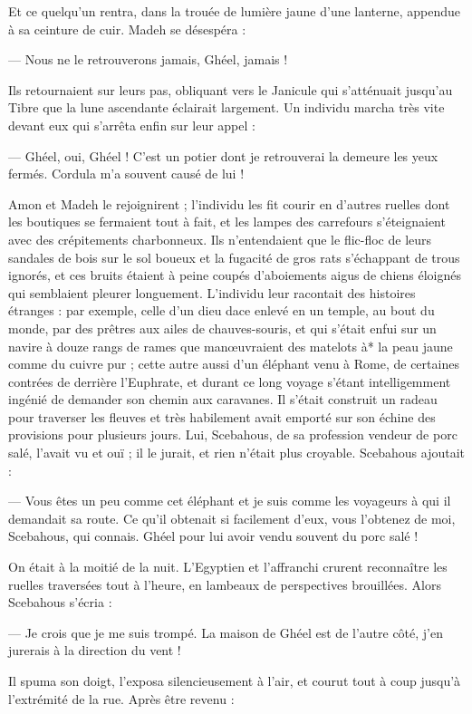 \documentclass[a4paper, 11pt, oneside, polutonikogreek, french]{article}
\begin{document}
Et ce quelqu'un rentra, dans la trouée de lumière jaune d'une lanterne, appendue à sa ceinture de cuir. Madeh se désespéra :

--- Nous ne le retrouverons jamais, Ghéel, jamais !

Ils retournaient sur leurs pas, obliquant vers le Janicule qui s'atténuait jusqu'au Tibre que la lune ascendante éclairait largement. Un individu marcha très vite devant eux qui s'arrêta enfin sur leur appel :

--- Ghéel, oui, Ghéel ! C'est un potier dont je retrouverai la demeure les yeux fermés. Cordula m'a souvent causé de lui !

Amon et Madeh le rejoignirent ; l'individu les fit courir en d'autres ruelles dont les boutiques se fermaient tout à fait, et les lampes des carrefours s'éteignaient avec des crépitements charbonneux. Ils n'entendaient que le flic-floc de leurs sandales de bois sur le sol boueux et la fugacité de gros rats s'échappant de trous ignorés, et ces bruits étaient à peine coupés d'aboiements aigus de chiens éloignés qui semblaient pleurer longuement. L'individu leur racontait des histoires étranges : par exemple, celle d'un dieu dace enlevé en un temple, au bout du monde, par des prêtres aux ailes de chauves-souris, et qui s'était enfui sur un navire à douze rangs de rames que manœuvraient des matelots à* la peau jaune comme du cuivre pur ; cette autre aussi d'un éléphant venu à Rome, de certaines contrées de derrière l'Euphrate, et durant ce long voyage s'étant intelligemment ingénié de demander son chemin aux caravanes. Il s'était construit un radeau pour traverser les fleuves et très habilement avait emporté sur son échine des provisions pour plusieurs jours. Lui, Scebahous, de sa profession vendeur de porc salé, l'avait vu et ouï ; il le jurait, et rien n'était plus croyable. Scebahous ajoutait :

--- Vous êtes un peu comme cet éléphant et je suis comme les voyageurs à qui il demandait sa route. Ce qu'il obtenait si facilement d'eux, vous l'obtenez de moi, Scebahous, qui connais. Ghéel pour lui avoir vendu souvent du porc salé !

On était à la moitié de la nuit. L'Egyptien et l'affranchi crurent reconnaître les ruelles traversées tout à l'heure, en lambeaux de perspectives brouillées. Alors Scebahous s'écria :

--- Je crois que je me suis trompé. La maison de Ghéel est de l'autre côté, j'en jurerais à la direction du vent !

Il spuma son doigt, l'exposa silencieusement à l'air, et courut tout à coup jusqu'à l'extrémité de la rue. Après être revenu :
\end{document}
